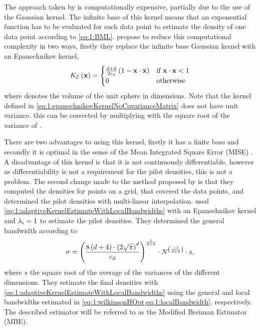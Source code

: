 	The approach taken by \citeauthor{breiman1977variable} is computationally expensive, partially due to the use of the Gaussian kernel. The infinite base of this kernel means that an exponential function has to be evaluated for each data point to estimate the density of one data point according to \cref{eq:1:BML}. \textcite{wilkinson1995dataplot} propose to reduce this computational complexity in two ways, firstly they replace the infinite base Gaussian kernel with an Epanechnikov kernel,
	\begin{equation}\label{eq:1:epanechnikovKernelNoCovarianceMatrix}
		\varKernel[\varEpan]{\varPattern} = 
		\begin{cases}
			\frac{\varDim + 2}{2\varUnitSphere{\varDim}} \left( 1 - \varPattern \cdot \varPattern \right) & \text{if } \varPattern \cdot \varPattern < 1\\
			0 & \text{otherwise}
		\end{cases}
	\end{equation}
	where \varUnitSphere{\varDim} denotes the volume of the unit sphere in \varDim dimensions. Note that the kernel defined in \cref{eq:1:epanechnikovKernelNoCovarianceMatrix} does not have unit variance. this can be corrected by multiplying \varBandwidth with the square root of the variance of \varKernel[\varEpan]{\cdot}.

	 There are two advantages to using this kernel, firstly it has a finite base and secondly it is optimal in the sense of the Mean Integrated Square Error (MISE) \cite{epanechnikov1969non}. A disadvantage of this kernel is that it is not continuously differentiable, however as differentiability is not a requirement for the pilot densities, this is not a problem.
	The second change \textcite{wilkinson1995dataplot} made to the method proposed by \textcite{breiman1977variable} is that they computed the densities for points on a grid, that covered the data points, and determined the pilot densities with multi-linear interpolation. \citeauthor{wilkinson1995dataplot} used \cref{eq:1:adaptiveKernelEstimateWithLocalBandwidths} with an Epanechnikov kernel and $\lambda_{i} = 1$ to estimate the pilot densities. They determined the general bandwidth according to
		\begin{equation}\label{eq:1:wilkinsonHOpt}
			\sigma = \left(\frac{8\left(d + 4\right) \cdot \left(2 \sqrt{\pi}\right)^d}{c_{d}}\right)^{\frac{1}{d + 4}}\cdot N^{\left(\frac{-1}{d +  4}\right)} \cdot s,
		\end{equation}
	where $s$ the square root of the average of the variances of the different dimensions. They estimate the final densities with \cref{eq:1:adaptiveKernelEstimateWithLocalBandwidths} using the general and local bandwidths estimated in \cref{eq:1:wilkinsonHOpt,eq:1:localBandwidth}, respectively. The described estimator will be referred to as the Modified Breiman Estimator (MBE). 

